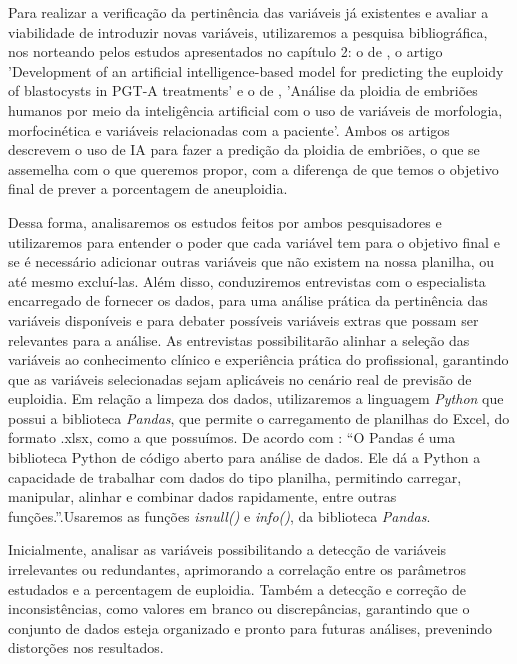 Para realizar a verificação da pertinência das variáveis já existentes e avaliar a viabilidade de introduzir novas variáveis, utilizaremos a pesquisa bibliográfica, nos norteando pelos estudos apresentados no capítulo 2: o de , o artigo 'Development of an artificial intelligence-based model for predicting the euploidy of blastocysts in PGT-A treatments' e o de , 'Análise da ploidia de embriões humanos por meio da inteligência artificial com o uso de variáveis de morfologia, morfocinética e variáveis relacionadas com a paciente'. Ambos os artigos descrevem o uso de IA para fazer a predição da ploidia de embriões, o que se assemelha com o que queremos propor, com a diferença de que temos o objetivo final de prever a porcentagem de aneuploidia. 

Dessa forma, analisaremos os estudos feitos por ambos pesquisadores e utilizaremos para entender o poder que cada variável tem para o objetivo final e se é necessário adicionar outras variáveis que não existem na nossa planilha, ou até mesmo excluí-las. Além disso, conduziremos entrevistas com o especialista encarregado de fornecer os dados, para uma análise prática da pertinência das variáveis disponíveis e para debater possíveis variáveis extras que possam ser relevantes para a análise. As entrevistas possibilitarão alinhar a seleção das variáveis ao conhecimento clínico e experiência prática do profissional, garantindo que as variáveis selecionadas sejam aplicáveis no cenário real de previsão de euploidia. Em relação a limpeza dos dados, utilizaremos a linguagem \textit{Python} que possui a biblioteca \textit{Pandas}, que permite o carregamento de planilhas do Excel, do formato .xlsx, como a que possuímos. De acordo com : “O Pandas é uma biblioteca Python de código aberto para análise de dados. Ele dá a Python a capacidade de trabalhar com dados do tipo planilha, permitindo carregar, manipular, alinhar e combinar dados rapidamente, entre outras funções.”.Usaremos as funções \textit{isnull()} e \textit{info()}, da biblioteca \textit{Pandas}.

Inicialmente, analisar as variáveis possibilitando a detecção de variáveis irrelevantes ou redundantes, aprimorando a correlação entre os parâmetros estudados e a percentagem de euploidia. Também a detecção e correção de inconsistências, como valores em branco ou discrepâncias, garantindo que o conjunto de dados esteja organizado e pronto para futuras análises, prevenindo distorções nos resultados. 

